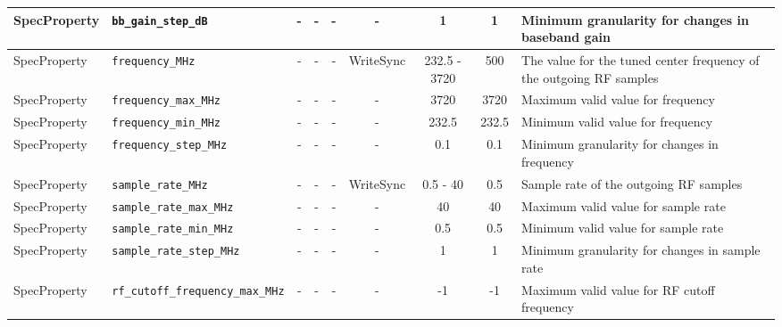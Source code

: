 \documentclass{article}
\begin{document}
\begin{landscape}
\begin{scriptsize}
\begin{tabular}{|p{2cm}|p{4cm}|c|c|c|c|c|c|p{6.5cm}|}
			\hline
			SpecProperty & \verb+bb_gain_step_dB+              & -    & -        & -          & -              & 1            & 1       & Minimum granularity for changes in baseband gain                                              \\
			\hline
			SpecProperty & \verb+frequency_MHz+                & -    & -        & -          & WriteSync      & 232.5 - 3720 & 500     & The value for the tuned center frequency of the outgoing RF samples                           \\
			\hline
			SpecProperty & \verb+frequency_max_MHz+            & -    & -        & -          & -              & 3720         & 3720    & Maximum valid value for frequency                                                             \\
			\hline
			SpecProperty & \verb+frequency_min_MHz+            & -    & -        & -          & -              & 232.5        & 232.5   & Minimum valid value for frequency                                                             \\
			\hline
			SpecProperty & \verb+frequency_step_MHz+           & -    & -        & -          & -              & 0.1          & 0.1     & Minimum granularity for changes in frequency                                                  \\
			\hline
			SpecProperty & \verb+sample_rate_MHz+              & -    & -        & -          & WriteSync      & 0.5 - 40     & 0.5     & Sample rate of the outgoing RF samples                                                        \\
			\hline
			SpecProperty & \verb+sample_rate_max_MHz+          & -    & -        & -          & -              & 40           & 40      & Maximum valid value for sample rate                                                           \\
			\hline
			SpecProperty & \verb+sample_rate_min_MHz+          & -    & -        & -          & -              & 0.5          & 0.5     & Minimum valid value for sample rate                                                           \\
			\hline
			SpecProperty & \verb+sample_rate_step_MHz+         & -    & -        & -          & -              & 1            & 1       & Minimum granularity for changes in sample rate                                                \\
			\hline
			SpecProperty & \verb+rf_cutoff_frequency_max_MHz+  & -    & -        & -          & -              & -1           & -1      & Maximum valid value for RF cutoff frequency                                                   \\

\end{tabular}
\end{scriptsize}
\end{landscape}
\end{document}
